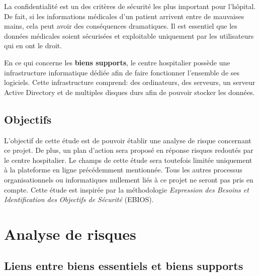 \documentclass[12pt]{article}
\begin{document}
\justify
La confidentialité est un des critères de sécurité les plus important pour l'hôpital. De fait, si les informations médicales d'un patient arrivent entre de mauvaises mains, cela peut avoir des conséquences dramatiques. Il est essentiel que les données médicales soient sécurisées et exploitable uniquement par les utilisateurs qui en ont le droit.

\justify
En ce qui concerne les \textbf{biens supports}, le centre hospitalier possède une infrastructure informatique dédiée afin de faire fonctionner l'ensemble de ses logiciels. Cette infrastructure comprend: des ordinateurs, des serveurs, un serveur Active Directory et de multiples disques durs afin de pouvoir stocker les données.

\subsection{Objectifs}

\justify
L'objectif de cette étude est de pouvoir établir une analyse de risque concernant ce projet. De plus, un plan d'action sera proposé en réponse risques redoutés par le centre hospitalier. Le champs de cette étude sera toutefois limitée uniquement à la plateforme en ligne précédemment mentionnée. Tous les autres processus organisationnels ou informatiques nullement liés à ce projet ne seront pas pris en compte. Cette étude est inspirée par la méthodologie \textit{Expression des Besoins et Identification des Objectifs de Sécurité} (EBIOS).\cite{ebios}

\section{Analyse de risques}

\subsection{Liens entre biens essentiels et biens supports} \label{lien-essentiel-support}
\end{document}
